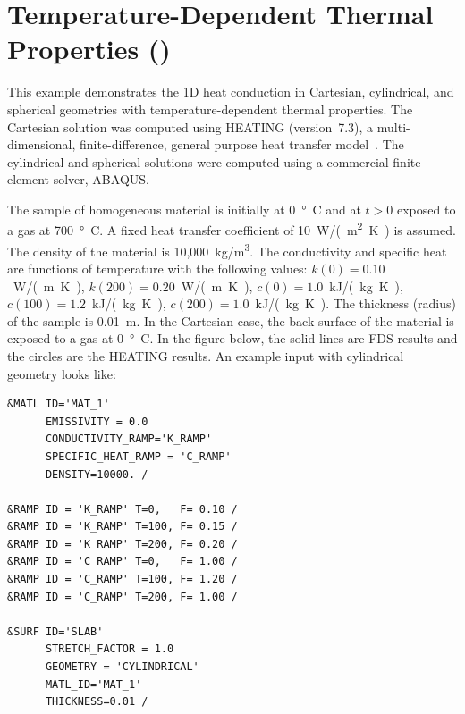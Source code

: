 \documentclass[11pt]{book}
\begin{document}
\clearpage

\section{Temperature-Dependent Thermal Properties (\texorpdfstring{}{heat\_conduction\_kc})}
\label{heat_conduction_kc}

This example demonstrates the 1D heat conduction in Cartesian, cylindrical, and spherical geometries with temperature-dependent thermal properties.
The Cartesian solution was computed using HEATING (version~7.3), a multi-dimensional, finite-difference, general purpose heat transfer
model~\cite{Childs}. The cylindrical and spherical solutions were computed using a commercial finite-element solver, ABAQUS.

The sample of homogeneous material is initially at 0~\si{\degree C} and at $t>0$ exposed to a gas at 700~\si{\degree C}. A fixed heat transfer coefficient of
10~\si{W/(m^2.K)} is assumed. The density of the material is 10,000~\si{kg/m^3}. The conductivity and specific heat are functions of temperature with the
following values: $k(0)=0.10$~\si{W/(m.K)}, $k(200)=0.20$~\si{W/(m.K)}, $c(0)=1.0$~\si{kJ/(kg.K)}, $c(100)=1.2$~\si{kJ/(kg.K)}, $c(200)=1.0$~\si{kJ/(kg.K)}. The thickness (radius) of
the sample is 0.01~m. In the Cartesian case, the back surface of the material is exposed to a gas at 0~\si{\degree C}. In the figure below, the solid
lines are FDS results and the circles are the HEATING results. An example input with cylindrical geometry looks like:

\begin{lstlisting}
&MATL ID='MAT_1'
      EMISSIVITY = 0.0
      CONDUCTIVITY_RAMP='K_RAMP'
      SPECIFIC_HEAT_RAMP = 'C_RAMP'
      DENSITY=10000. /

&RAMP ID = 'K_RAMP' T=0,   F= 0.10 /
&RAMP ID = 'K_RAMP' T=100, F= 0.15 /
&RAMP ID = 'K_RAMP' T=200, F= 0.20 /
&RAMP ID = 'C_RAMP' T=0,   F= 1.00 /
&RAMP ID = 'C_RAMP' T=100, F= 1.20 /
&RAMP ID = 'C_RAMP' T=200, F= 1.00 /

&SURF ID='SLAB'
      STRETCH_FACTOR = 1.0
      GEOMETRY = 'CYLINDRICAL'
      MATL_ID='MAT_1'
      THICKNESS=0.01 /
\end{lstlisting}
\end{document}
